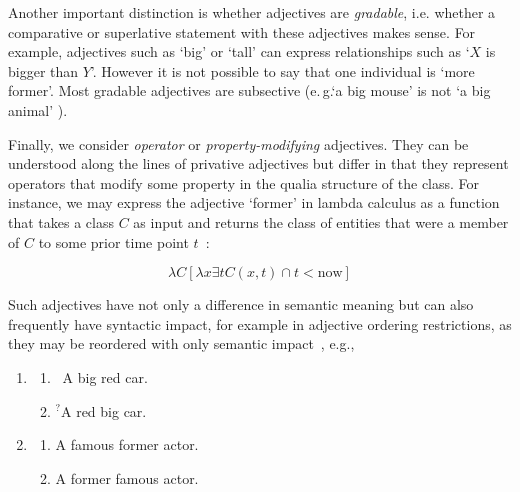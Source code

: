 \documentclass[11pt]{article}
\begin{document}
%
%

Another important distinction is whether adjectives are 
\emph{gradable}, i.e. whether a comparative 
or superlative statement with these adjectives makes sense. For example, adjectives such as 
`big' or `tall' can express relationships such as `$X$ is bigger than $Y$'. 
However it is not possible to say that one individual is `more former'. Most gradable 
adjectives are subsective (e.\,g.`a big mouse' is not `a big animal' \cite{morzycki2013nonscales}). 

Finally, we consider \emph{operator} or \emph{property-modifying} adjectives. 
They can be understood along the lines of privative adjectives but differ in that they represent 
operators that modify some property in the qualia 
structure of the class. For instance, we may express the adjective `former' 
in lambda calculus as a function that takes a class $C$ as input and returns the class 
of entities that were a member of $C$ to some prior time point $t$~\cite{partee2003there}:

\vspace{-1.0em}
$$\lambda C [\lambda x \exists t C(x,t) \cap t < \mathrm{now}]$$
\vspace{-1.5em}

Such adjectives have not only a difference in semantic meaning but can also 
frequently have syntactic impact, for example in adjective ordering 
restrictions, as they may be reordered with only semantic 
impact~\cite{teodorescu2006adjective}, e.g.,

\begin{enumerate}
\item \begin{enumerate}
\item \ A big red car.
\item $^?$A red big car.
\end{enumerate} 
\label{ex:car}
\item \begin{enumerate}
\item A famous former actor.
\item A former famous actor.
\end{enumerate}
\label{ex:actor}
\end{enumerate}
\end{document}
